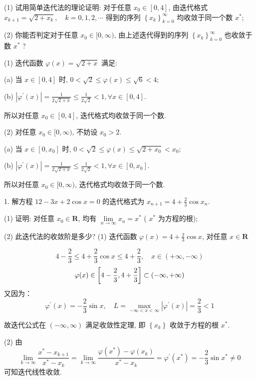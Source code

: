 \begin{tcolorbox}[enhanced,colback=8,colframe=7,breakable,coltitle=green!25!black,title=2024]
 (1) 试用简单迭代法的理论证明: 对于任意 $ x_{0} \in[0,4] $, 由迭代格式
$
x_{k+1}=\sqrt{2+x_{k}}, \quad k=0,1,2, \cdots
$
得到的序列 $ \left\{x_{k}\right\}_{k=0}^{\infty} $ 均收敛于同一个数 $ x^{*} $;

(2) 你能否判定对于任意 $ x_{0} \in[0, \infty) $, 由上述迭代得到的序列 $ \left\{x_{k}\right\}_{k=0}^{\infty} $ 也收敛于数 $ x^{*} $ ?

\tcblower
 (1) 迭代函数 $ \varphi(x)=\sqrt{2+x} $ 满足:
 
(a) 当 $ x \in[0,4] $ 时, $ 0<\sqrt{2} \leqslant \varphi(x) \leqslant \sqrt{6}<4 $;

(b) $ \left|\varphi^{\prime}(x)\right|=\frac{1}{2 \sqrt{2+x}} \leqslant \frac{1}{2 \sqrt{2}}<1, \forall x \in[0,4] $.

所以对任意 $ x_{0} \in[0,4] $, 迭代格式均收敛于同一个数.

(2) 对任意 $ x_{0} \in[0, \infty) $, 不妨设 $ x_{0}>2 $.

(a) 当 $ x \in\left[0, x_{0}\right] $ 时, $ 0<\sqrt{2} \leqslant \varphi(x) \leqslant \sqrt{2+x_{0}}<x_{0} $;

(b) $ \left|\varphi^{\prime}(x)\right|=\frac{1}{2 \sqrt{2+x}} \leqslant \frac{1}{2 \sqrt{2}}<1, \forall x \in\left[0, x_{0}\right] $.

所以对任意 $ x_{0} \in[0, \infty) $, 迭代格式均收敛于同一个数.
\end{tcolorbox}

\begin{tcolorbox}[enhanced,colback=8,colframe=7,breakable,coltitle=green!25!black,title=2024]
1. 解方程 $ 12-3 x+2 \cos x=0 $ 的迭代格式为 $ x_{n+1}=4+\frac{2}{3} \cos x_{n} $.

(1) 证明: 对任意 $ x_{0} \in \mathbf{R} $, 均有 $ \lim\limits _{n \rightarrow \infty} x_{n}=x^{*} $ ( $ x^{*} $ 为方程的根);

(2) 此迭代法的收敛阶是多少?
 \tcblower
 (1) 迭代函数 $ \varphi(x)=4+\frac{2}{3} \cos x $, 对任意 $ x \in \mathbf{R} $

$$
4-\frac{2}{3} \leqslant 4+\frac{2}{3} \cos x \leqslant 4+\frac{2}{3},\quad x \in(+\infty,-\infty)
$$
$$
\varphi(x) \in\left[4-\frac{2}{3}, 4+\frac{2}{3}\right] \subset(-\infty,+\infty) \\
$$
又因为：
$$
\varphi^{\prime}(x)=-\frac{2}{3} \sin x, \quad L=\max _{-\infty<x<\infty}\left|\varphi^{\prime}(x)\right|=\frac{2}{3}<1
$$

故迭代公式在 $ (-\infty, \infty) $ 满足收敛性定理, 即 $ \left\{x_{k}\right\} $ 收敛于方程的根 $ x^{*} $.

(2) 由
$$
\lim _{k \rightarrow \infty} \frac{x^{*}-x_{k+1}}{x^{*}-x_{k}}=\lim _{k \rightarrow \infty} \frac{\varphi\left(x^{*}\right)-\varphi\left(x_{k}\right)}{x^{*}-x_{k}}=\varphi^{\prime}\left(x^{*}\right)=-\frac{2}{3} \sin x^{*} \neq 0
$$
可知迭代线性收敛.
 \end{tcolorbox}


